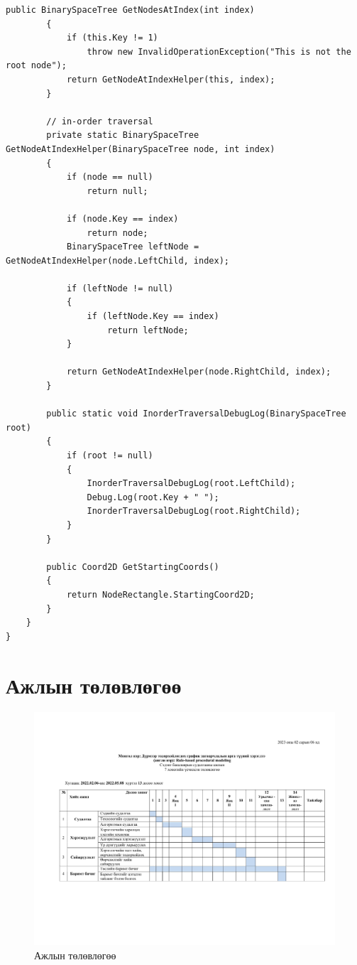 \begin{lstlisting}[language={[Sharp]C}, frame=single, caption=BinarySpaceTree хэрэгжүүлэлт]
        public BinarySpaceTree GetNodesAtIndex(int index)
        {
            if (this.Key != 1)
                throw new InvalidOperationException("This is not the root node");
            return GetNodeAtIndexHelper(this, index);
        }

        // in-order traversal
        private static BinarySpaceTree GetNodeAtIndexHelper(BinarySpaceTree node, int index)
        {
            if (node == null)
                return null;

            if (node.Key == index)
                return node;
            BinarySpaceTree leftNode = GetNodeAtIndexHelper(node.LeftChild, index);

            if (leftNode != null)
            {
                if (leftNode.Key == index)
                    return leftNode;
            }

            return GetNodeAtIndexHelper(node.RightChild, index);
        }

        public static void InorderTraversalDebugLog(BinarySpaceTree root)
        {
            if (root != null)
            {
                InorderTraversalDebugLog(root.LeftChild);
                Debug.Log(root.Key + " ");
                InorderTraversalDebugLog(root.RightChild);
            }
        }

        public Coord2D GetStartingCoords()
        {
            return NodeRectangle.StartingCoord2D;
        }
    }
}
\end{lstlisting}
\chapter{Ажлын төлөвлөгөө}
\begin{figure}[b]
	\centering
	\includegraphics[angle=90,height=\textheight]{./images/plan.pdf}
	\caption{Ажлын төлөвлөгөө}
	\label{fig:WorkPlan}
\end{figure}
